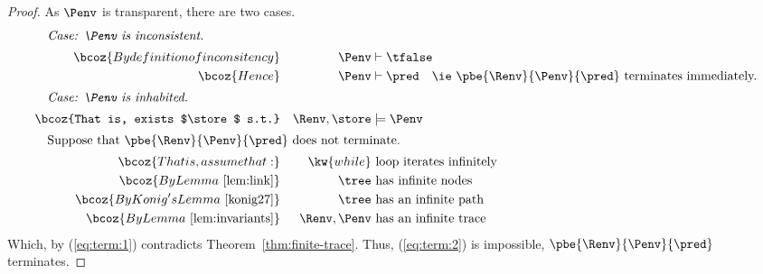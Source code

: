 \begin{proof}
As $\Penv$ is transparent, there are two cases.
%
\begin{alignat}{3}
%
\intertext{\quad \emph{Case: $\Penv$ is inconsistent.}}
%
\bcoz{By definition of inconsitency}
  && \Penv & \vdash \tfalse \notag \\
\bcoz{Hence}
  && \Penv & \vdash \pred \quad \mbox{\ie $\pbe{\Renv}{\Penv}{\pred}$ terminates immediately.}
     \notag \\%
%
\intertext{\quad \emph{Case: $\Penv$ is inhabited.}}
%
\bcoz{That is, exists $\store$ s.t.}
  && \Renv, \store & \models \Penv \label{eq:term:1} \\
\intertext{\quad Suppose that $\pbe{\Renv}{\Penv}{\pred}$ does not terminate.}
\bcoz{That is, assume that:}
  && \kw{while} & \ \mbox{loop iterates infinitely}
  \label{eq:term:2} \\
\bcoz{By Lemma~\ref{lem:link}}
  && \tree & \ \mbox{has infinite nodes} \notag \\
\bcoz{By Konig's Lemma~\cite{konig27}}
  && \tree & \ \mbox{has an infinite path} \notag \\
\bcoz{By Lemma~\ref{lem:invariants}}
  && \Renv,\Penv & \ \mbox{has an infinite trace} \notag
\end{alignat}
Which, by (\ref{eq:term:1}) contradicts Theorem~\ref{thm:finite-trace}.
Thus, (\ref{eq:term:2}) is impossible, \ie $\pbe{\Renv}{\Penv}{\pred}$
terminates.
\end{proof}


